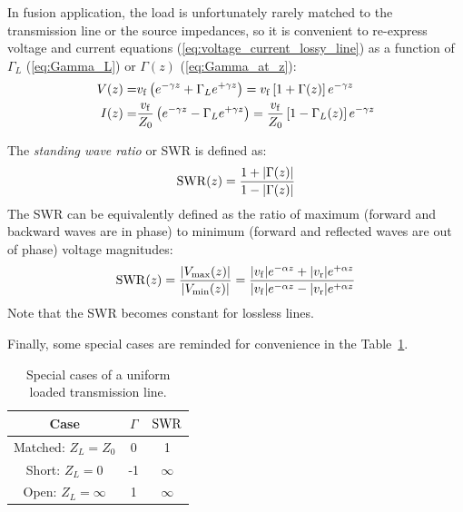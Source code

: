 In fusion application, the load is unfortunately rarely matched to the transmission line or the source impedances, so it is convenient to re-express voltage and current equations (\ref{eq:voltage_current_lossy_line}) as a function of $\Gamma_L$ (\ref{eq:Gamma_L}) or $\Gamma(z)$ (\ref{eq:Gamma_at_z}):
\begin{subequations}
	\begin{align}
		V(z) =& {v_{\mathrm{f}}} \left( e^{-\gamma z} + \Gamma_L e^{+\gamma z} \right) 
			= {v_{\mathrm{f}}} \left[ 1 + \Gamma(z) \right]  e^{-\gamma z} \\
		I(z) =& \frac{{v_{\mathrm{f}}}}{Z_0} \left( e^{-\gamma z} - \Gamma_L e^{+\gamma z} \right)
			= \frac{{v_{\mathrm{f}}}}{Z_0} \left[ 1 - \Gamma_L(z)  \right]e^{-\gamma z}
	\end{align}
	\label{eq:voltage_current_lossy_line_gamma}
\end{subequations} 

The \textit{standing wave ratio} or SWR is defined as:
\begin{equation}
	{\mathrm{SWR}}(z) = \frac{1 + |\Gamma(z)|}{1 - |\Gamma(z)|}
	\label{eq:SWR}
\end{equation}
The SWR can be equivalently defined as the ratio of maximum (forward and backward waves are in phase) to minimum (forward and reflected waves are out of phase) voltage magnitudes: 
\begin{equation}
{\mathrm{SWR}}(z) = \frac{|V_\mathrm{max}(z)|}{|V_\mathrm{min}(z)|} = \frac{|{v_{\mathrm{f}}}|e^{-\alpha z} + |{v_{\mathrm{r}}}|e^{+\alpha z}}{|{v_{\mathrm{f}}}|e^{-\alpha z} - |{v_{\mathrm{r}}}|e^{+\alpha z}}
\label{eq:SWR_max_to_min_voltages}
\end{equation}
Note that the SWR becomes constant for lossless lines. 


Finally, some special cases are reminded for convenience in the Table~\ref{tab:special_case_loaded_line}.

\begin{table}[h]
	\begin{center}
\begin{tabular}{|c|c|c|}
	\hline 
	Case & $\Gamma$ & ${\mathrm{SWR}}$ \\ 
	\hline 
	Matched: $Z_L = Z_0$ & 0 & 1 \\ 
	\hline 
	Short: $Z_L=0$ & -1 & $\infty$ \\ 
	\hline 
	Open: $Z_L = \infty$ & 1 & $\infty$ \\
	\hline
\end{tabular}
	\end{center}
\caption{Special cases of a uniform loaded transmission line.}
\label{tab:special_case_loaded_line} 
\end{table}


